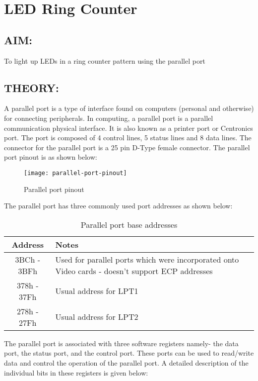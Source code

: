 \chapter{LED Ring Counter}
%
%
%
\section*{AIM:}
To light up LEDs in a ring counter pattern using the parallel port
\section*{THEORY:}
A parallel port is a type of interface found on computers (personal and otherwise) for connecting peripherals. In computing, a parallel port is a parallel communication physical interface. It is also known as a printer port or Centronics port. The port is composed of 4 control lines, 5 status lines and 8 data lines. The connector for the parallel port is a 25 pin D-Type female connector. The parallel port pinout is as shown below:

\begin{figure}[h]
\centering
\texttt{[image: parallel-port-pinout]}
\caption{Parallel port pinout}
\end{figure}

The parallel port has three commonly used port addresses as shown below:

\newpage
\begin{table}[h]
\centering
\bgroup
\def\arraystretch{1.5}
\begin{tabular}{ |c|p{7cm}| }
\hline
\textbf{Address} & \textbf{Notes}\\
\hline
3BCh - 3BFh & Used for parallel ports which were incorporated onto Video cards - doesn't support ECP addresses\\
\hline
378h - 37Fh & Usual address for LPT1\\
\hline
278h - 27Fh & Usual address for LPT2\\
\hline
\end{tabular}
\caption{Parallel port base addresses}
\egroup
\end{table}

The parallel port is associated with three software registers namely- the data port, the status port, and the control port.
These ports can be used to read/write data and control the operation of the parallel port. A detailed description of the individual bits in these registers is given below:

